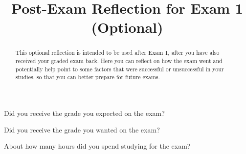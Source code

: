\documentclass{ximera}
\title{Post-Exam Reflection for Exam 1 (Optional)}
\begin{document}
\begin{abstract}
This optional reflection is intended to be used after Exam 1, after you have also received your graded exam back. Here you can reflect on how the exam went and potentially help point to some factors that were successful or unsuccessful in your studies, so that you can better prepare for future exams.
\end{abstract}
\maketitle


\begin{question}
    Did you receive the grade you expected on the exam?

  \begin{multipleChoice}
  \end{multipleChoice}
\end{question}

\begin{question}
    Did you receive the grade you wanted on the exam?

  \begin{multipleChoice}
  \end{multipleChoice}
\end{question}

\begin{question}
  About how many hours did you spend studying for the exam?
  \begin{multipleChoice}
  \end{multipleChoice}
\end{question}
\end{document}
